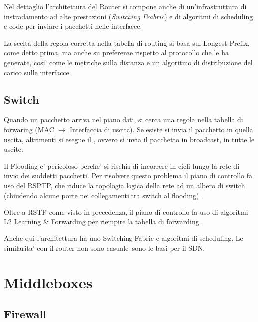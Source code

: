Nel dettaglio l'architettura del Router si compone anche di un'infrastruttura di instradamento ad alte prestazioni (\textit{Switching Frabric}) e di algoritmi di scheduling e code per inviare i pacchetti nelle interfacce.


La scelta della regola corretta nella tabella di routing si basa sul Longest Prefix, come detto prima, ma anche su preferenze rispetto al protocollo che le ha generate, cosi' come le metriche sulla distanza e un algoritmo di distribuzione del carico sulle interfacce.


\subsection{Switch}

Quando un pacchetto arriva nel piano dati, si cerca una regola nella tabella di forwaring (MAC $\rightarrow$ Interfaccia di uscita). Se esiste si invia il pacchetto in quella uscita, altrimenti si esegue il , ovvero si invia il pacchetto in broadcast, in tutte le uscite.


Il Flooding e' pericoloso perche' si rischia di incorrere in cicli lungo la rete di invio dei suddetti pacchetti. Per risolvere questo problema il piano di controllo fa uso del RSPTP, che riduce la topologia logica della rete ad un albero di switch (chiudendo alcune porte nei collegamenti tra switch al flooding).

Oltre a RSTP come visto in precedenza, il piano di controllo fa uso di algoritmi L2 Learning \& Forwarding per riempire la tabella di forwarding.


Anche qui l'architettura ha uno Switching Fabric e algoritmi di scheduling. Le similarita' con il router non sono casuale, sono le basi per il SDN.


\section{Middleboxes}

\subsection{Firewall}

